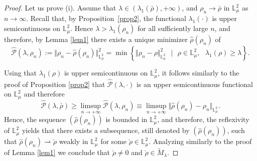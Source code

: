 \documentclass[10pt,a4paper]{amsart}
\begin{document}
\begin{proof}
Let us prove (i). Assume that $\lambda \in (\lambda _{1}(\bar{\rho}),+\infty
)$, and $\rho _{n}\rightarrow \bar{\rho}$ in $\mathbb{L}_{\mu }^{2}$ as $%
n\rightarrow \infty $. Recall that, by Proposition~\ref{prop2}, the
functional $\lambda _{1}(\cdot )$ is upper semicontinuous on $\mathbb{L}%
_{\mu }^{2}$. Hence $\lambda >\lambda _{1}(\rho _{n})$ for all sufficiently
large $n$, and therefore, by Lemma \ref{lem1} there exists a unique
minimizer $\hat{\rho}(\rho _{n})$ of
\begin{equation*}
\hat{\mathcal{P}}(\lambda ,\rho _{n}):=\Vert \rho _{n}-\hat{\rho}(\rho
_{n})\Vert _{\mathbb{L}_{\mu }^{2}}^{2}=\min \left\{ \Vert \rho _{n}-\rho
\Vert _{\mathbb{L}_{\mu }^{2}}^{2}\text{ }|\text{\ }\rho \in \mathbb{L}_{\mu
}^{2},\text{ }\lambda _{1}(\rho )\geq \lambda \right\} .
\end{equation*}

Using that $\lambda _{1}(\rho )$ is upper semicontinuous on $\mathbb{L}_{\mu
}^{2}$, it follows similarly to the proof of Proposition \ref{prop2} that $%
\hat{\mathcal{P}}(\lambda ,\cdot )$ is an upper semicontinuous functional on
$\mathbb{L}_{\mu }^{2}$ and therefore
\begin{equation}
\hat{\mathcal{P}}(\lambda ,\bar{\rho})\geq \limsup_{n\rightarrow +\infty }%
\hat{\mathcal{P}}(\lambda ,\rho _{n})\equiv \limsup_{n\rightarrow +\infty
}\Vert \hat{\rho}(\rho _{n})-\rho _{n}\Vert _{\mathbb{L}_{\mu }^{2}}.
\label{eq:mathcaP_conv}
\end{equation}%
Hence, the sequence $(\hat{\rho}(\rho _{n}))$ is bounded in $\mathbb{L}_{\mu
}^{2}$, and therefore, the reflexivity of $\mathbb{L}_{\mu }^{2}$ yields
that there exists a subsequence, still denoted by $(\hat{\rho}(\rho _{n}))$,
such that $\hat{\rho}(\rho _{n})\rightharpoonup \check{\rho}$ weakly in $%
\mathbb{L}_{\mu }^{2}$ for some $\check{\rho}\in \mathbb{L}_{\mu }^{2}$.
Analyzing similarly to the proof of Lemma \ref{lem1} we conclude that $%
\check{\rho}\neq 0$ and $\check{\rho}\in \tilde{M}_{\lambda }$.


\end{proof}
\end{document}
